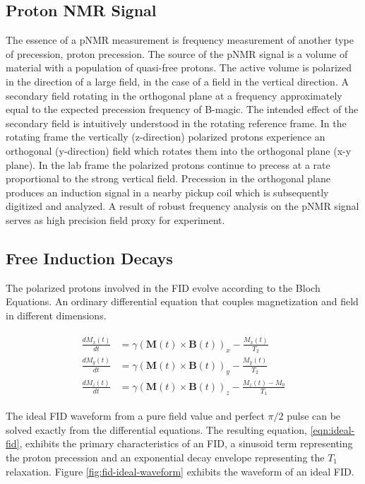 \subsection{Proton NMR Signal}

The essence of a pNMR measurement is frequency measurement of another type of precession, proton precession.  The source of the pNMR signal is a volume of material with a population of quasi-free protons.  The active volume is polarized in the direction of a large field, in the case of \gmtwo a \bmagic field in the vertical direction.  A secondary field rotating in the orthogonal plane at a frequency approximately equal to the expected precession frequency of B-magic.  The intended effect of the secondary field is intuitively understood in the rotating reference frame.  In the rotating frame the vertically (z-direction) polarized protons experience an orthogonal (y-direction) field which rotates them into the orthogonal plane (x-y plane).  In the lab frame the polarized protons continue to precess at a rate proportional to the strong vertical field.  Precession in the orthogonal plane produces an induction signal in a nearby pickup coil which is subsequently digitized and analyzed.  A result of robust frequency analysis on the pNMR signal serves as high precision field proxy for \gmtwo experiment.

\subsection{Free Induction Decays}

The polarized protons involved in the FID evolve according to the Bloch Equations.  An ordinary differential equation that couples magnetization and field in different dimensions.

\begin{align} 
\begin{split}
\label{eqn:fid-bloch}
\frac{dM_x(t)}{dt} & = \gamma (\mathbf{M}(t) \times \mathbf{B}(t))_x - \frac{M_x(t)}{T_2} \\
\frac{dM_y(t)}{dt} & = \gamma (\mathbf{M}(t)\times \mathbf{B}(t))_y - \frac{M_y(t)}{T_2} \\
\frac{dM_z(t)}{dt} & = \gamma (\mathbf{M}(t) \times \mathbf{B}(t))_z - \frac{M_z(t) - M_0}{T_1}
\end{split} 
\end{align}

The ideal FID waveform from a pure field value and perfect $\pi/2$ pulse can be solved exactly from the differential equations.  The resulting equation, \ref{eqn:ideal-fid}, exhibits the primary characteristics of an FID, a sinusoid term representing the proton precession and an exponential decay envelope representing the $T_1$ relaxation.  Figure \ref{fig:fid-ideal-waveform} exhibits the waveform of an ideal FID.

